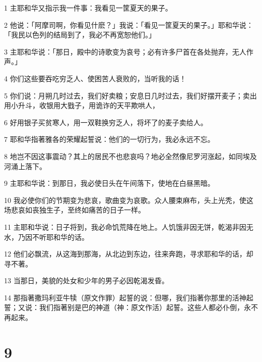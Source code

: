 \par 1 主耶和华又指示我一件事：我看见一筐夏天的果子。
\par 2 他说：「阿摩司啊，你看见什麽？」我说：「看见一筐夏天的果子。」耶和华说：「我民以色列的结局到了，我必不再宽恕他们。」
\par 3 主耶和华说：「那日，殿中的诗歌变为哀号；必有许多尸首在各处抛弃，无人作声。」
\par 4 你们这些要吞吃穷乏人、使困苦人衰败的，当听我的话！
\par 5 你们说：月朔几时过去，我们好卖粮；安息日几时过去，我们好摆开麦子；卖出用小升斗，收银用大戥子，用诡诈的天平欺哄人，
\par 6 好用银子买贫寒人，用一双鞋换穷乏人，将坏了的麦子卖给人。
\par 7 耶和华指著雅各的荣耀起誓说：他们的一切行为，我必永远不忘。
\par 8 地岂不因这事震动？其上的居民不也悲哀吗？地必全然像尼罗河涨起，如同埃及河涌上落下。
\par 9 主耶和华说：到那日，我必使日头在午间落下，使地在白昼黑暗。
\par 10 我必使你们的节期变为悲哀，歌曲变为哀歌。众人腰束麻布，头上光秃，使这场悲哀如丧独生子，至终如痛苦的日子一样。
\par 11 主耶和华说：日子将到，我必命饥荒降在地上。人饥饿非因无饼，乾渴非因无水，乃因不听耶和华的话。
\par 12 他们必飘流，从这海到那海，从北边到东边，往来奔跑，寻求耶和华的话，却寻不著。
\par 13 当那日，美貌的处女和少年的男子必因乾渴发昏。
\par 14 那指著撒玛利亚牛犊（原文作罪）起誓的说：但哪，我们指著你那里的活神起誓；又说：我们指著别是巴的神道（神：原文作活）起誓。这些人都必仆倒，永不再起来。

\chapter{9}

